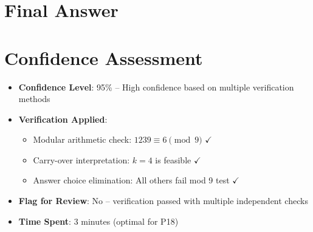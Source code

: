 \documentclass[]{article}
\begin{document}
\section*{Final Answer}

\section*{Confidence Assessment}
\begin{itemize}[leftmargin=*]
    \item \textbf{Confidence Level}: 95\% -- High confidence based on multiple verification methods
    \item \textbf{Verification Applied}: 
    \begin{itemize}
        \item Modular arithmetic check: $1239 \equiv 6 \pmod{9}$ $\checkmark$
        \item Carry-over interpretation: $k = 4$ is feasible $\checkmark$
        \item Answer choice elimination: All others fail mod 9 test $\checkmark$
    \end{itemize}
    \item \textbf{Flag for Review}: No -- verification passed with multiple independent checks
    \item \textbf{Time Spent}: 3 minutes (optimal for P18)
\end{itemize}
\end{document}
